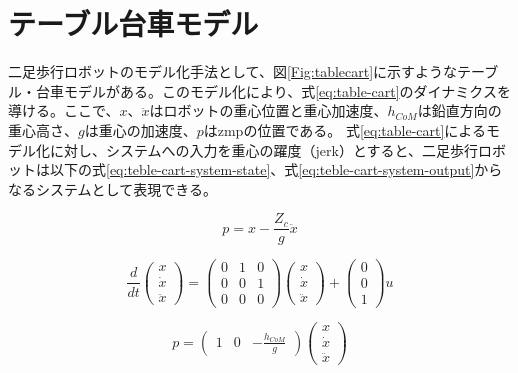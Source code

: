 \section{テーブル台車モデル}
二足歩行ロボットのモデル化手法として、図\ref{Fig:tablecart}に示すようなテーブル・台車モデルがある。このモデル化により、式\eqref{eq:table-cart}のダイナミクスを導ける。ここで、$x$、$\ddot{x}$はロボットの重心位置と重心加速度、$h_{CoM}$は鉛直方向の重心高さ、$g$は重心の加速度、$p$はzmpの位置である。
式\eqref{eq:table-cart}によるモデル化に対し、システムへの入力を重心の躍度（jerk）とすると、二足歩行ロボットは以下の式\eqref{eq:teble-cart-system-state}、式\eqref{eq:teble-cart-system-output}からなるシステムとして表現できる。

\begin{equation}
  p = x - \frac{Z_{c}}{g}\ddot{x}
  \label{eq:table-cart}
\end{equation}


\begin{equation}
  \frac{d}{dt}\begin{pmatrix}
    x \\ \dot{x} \\ \ddot{x}
  \end{pmatrix}
  =
  \begin{pmatrix}
    0 & 1 & 0 \\ 0 & 0 & 1 \\ 0 & 0 & 0
  \end{pmatrix}
  \begin{pmatrix}
    x \\ \dot{x} \\ \ddot{x}
  \end{pmatrix}
  +
  \begin{pmatrix}
    0 \\ 0 \\ 1
  \end{pmatrix}
  u
  \label{eq:teble-cart-system-state}
\end{equation}


\begin{equation}
  p = \begin{pmatrix}
    1 & 0 & -\frac{h_{CoM}}{g}
  \end{pmatrix}
  \begin{pmatrix}
    x \\ \dot{x} \\ \ddot{x}
  \end{pmatrix}
  \label{eq:teble-cart-system-output}
\end{equation}


